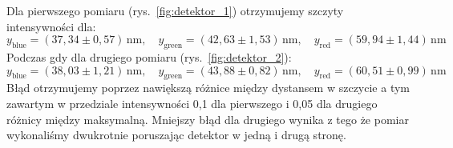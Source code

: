 \documentclass[12pt]{article}
\begin{document}
Dla pierwszego pomiaru (rys.~\ref{fig:detektor_1}) otrzymujemy szczyty intensywności dla:
\[
	y_{\mathrm{blue}} = (37{,}34 \pm 0{,}57) \, \mathrm{nm}, \quad y_{\mathrm{green}} = (42{,}63 \pm 1{,}53) \, \mathrm{nm}, \quad y_{\mathrm{red}} = (59{,}94 \pm 1{,}44) \, \mathrm{nm}
\]
Podczas gdy dla drugiego pomiaru (rys.~\ref{fig:detektor_2}):
\[
	y_{\mathrm{blue}} = (38{,}03 \pm 1{,}21) \, \mathrm{nm}, \quad y_{\mathrm{green}} = (43{,}88 \pm 0{,}82) \, \mathrm{nm}, \quad y_{\mathrm{red}} = (60{,}51 \pm 0{,}99) \, \mathrm{nm}
\]
Błąd otrzymujemy poprzez nawiększą różnice między dystansem w szczycie a tym zawartym w przedziale intensywności 0{,}1 dla pierwszego i 0{,}05 dla drugiego różnicy między maksymalną. Mniejszy błąd dla drugiego wynika z tego że pomiar wykonaliśmy dwukrotnie poruszając detektor w jedną i drugą stronę.
\end{document}
